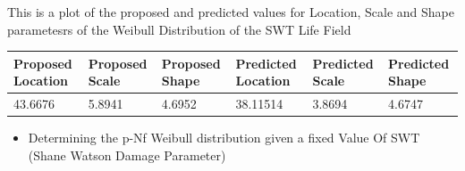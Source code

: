 \documentclass[11pt]{article}
\providecommand{\tightlist}{%
      \setlength{\itemsep}{0pt}\setlength{\parskip}{0pt}}
\begin{document}
This is a plot of the proposed and predicted values for Location, Scale
and Shape parametesrs of the Weibull Distribution of the SWT Life Field

\begin{longtable}[]{@{}llllll@{}}
\toprule
\begin{minipage}[b]{0.14\columnwidth}\raggedright
Proposed Location\strut
\end{minipage} & \begin{minipage}[b]{0.14\columnwidth}\raggedright
Proposed Scale\strut
\end{minipage} & \begin{minipage}[b]{0.14\columnwidth}\raggedright
Proposed Shape\strut
\end{minipage} & \begin{minipage}[b]{0.14\columnwidth}\raggedright
Predicted Location\strut
\end{minipage} & \begin{minipage}[b]{0.14\columnwidth}\raggedright
Predicted Scale\strut
\end{minipage} & \begin{minipage}[b]{0.14\columnwidth}\raggedright
Predicted Shape\strut
\end{minipage}\tabularnewline
\midrule
\endhead
\begin{minipage}[t]{0.14\columnwidth}\raggedright
43.6676\strut
\end{minipage} & \begin{minipage}[t]{0.14\columnwidth}\raggedright
5.8941\strut
\end{minipage} & \begin{minipage}[t]{0.14\columnwidth}\raggedright
4.6952\strut
\end{minipage} & \begin{minipage}[t]{0.14\columnwidth}\raggedright
38.11514\strut
\end{minipage} & \begin{minipage}[t]{0.14\columnwidth}\raggedright
3.8694\strut
\end{minipage} & \begin{minipage}[t]{0.14\columnwidth}\raggedright
4.6747\strut
\end{minipage}\tabularnewline
\bottomrule
\end{longtable}

\begin{itemize}
\tightlist
\item
  Determining the p-Nf Weibull distribution given a fixed Value Of SWT
  (Shane Watson Damage Parameter)
\end{itemize}
\end{document}
